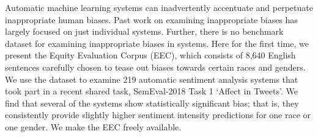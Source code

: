 Automatic machine learning systems can inadvertently accentuate and perpetuate inappropriate human biases. Past work on examining inappropriate biases has largely focused on just individual systems. Further, there is no benchmark dataset for examining inappropriate biases in systems. Here for the first time, we present the Equity Evaluation Corpus (EEC), which consists of 8,640 English sentences carefully chosen to tease out biases towards certain races and genders. We use the dataset to examine 219 automatic sentiment analysis systems that took part in a recent shared task, SemEval-2018 Task 1 `Affect in Tweets'. We find that several of the systems show statistically significant bias; that is, they consistently provide slightly higher sentiment intensity predictions for one race or one gender. We make the EEC freely available.
